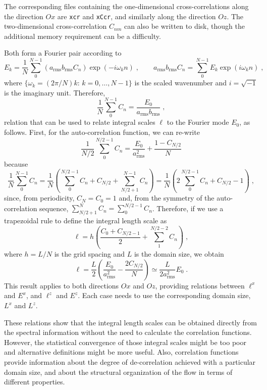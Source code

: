 The corresponding files containing the one-dimensional cross-correlations along
the direction $Ox$ are {\tt xcr} and {\tt xCcr}, and similarly along the
direction $Oz$. The two-dimensional cross-correlation $C_{nm}$ can also be
written to disk, though the additional memory requirement can be a difficulty.

Both form a Fourier pair according to
\begin{equation*}
E_k=\frac{1}{N}\sum_0^{N-1}(a_\mathrm{rms}b_\mathrm{rms}C_n)\exp(-i\omega_kn)\;,\qquad
a_\mathrm{rms}b_\mathrm{rms}C_n=\sum_0^{N-1}E_k\exp(i\omega_kn)\;,
\end{equation*}
where $\{\omega_k=(2\pi/N)k:\, k = 0,\ldots,N-1\}$ is the scaled wavenumber and
$i=\sqrt{-1}$ is the imaginary unit. Therefore,
\begin{equation}
\frac{1}{N}\sum_0^{N-1}C_n=\frac{E_0}{a_\mathrm{rms}b_\mathrm{rms}} \;,
\end{equation}
relation that can be used to relate integral scales $\ell$ to the Fourier mode
$E_0$, as follows. First, for the auto-correlation function, we can re-write
\begin{equation}
\frac{1}{N/2}\sum_0^{N/2-1}C_n=\frac{E_0}{a_\mathrm{rms}^2}+\frac{1-C_{N/2}}{N}
\end{equation}
because
\begin{equation*}
\frac{1}{N}\sum_0^{N-1}C_n = \frac{1}{N}\left(\sum_0^{N/2-1}C_n
+C_{N/2}+\sum_{N/2+1}^{N-1}C_n\right) = \frac{1}{N}\left(2\sum_0^{N/2-1}C_n
+C_{N/2}-1\right) \;,
\end{equation*}
since, from periodicity, $C_N=C_0=1$ and, from the symmetry of the
auto-correlation sequence, $\sum_{N/2+1}^{N}C_n=\sum_0^{N/2-1}C_n$. Therefore,
if we use a trapezoidal rule to define the integral length scale as
\begin{equation}
\ell=h\left(\frac{C_0+C_{N/2-1}}{2}+\sum_1^{N/2-2}C_n\right)\;,
\end{equation}
where $h=L/N$ is the grid spacing and $L$ is the domain size, we obtain
\begin{equation}
\ell=\frac{L}{2}\left(\frac{E_0}{a_\mathrm{rms}^2}-\frac{2C_{N/2}}{N}\right)
\simeq \frac{L}{2a_\mathrm{rms}^2}E_0\;.
\end{equation}
This result applies to both directions $Ox$ and $Oz$, providing relations
between $\ell^x$ and $E^x$, and $\ell^z$ and $E^z$. Each case needs to use the
corresponding domain size, $L^x$ and $L^z$.

These relations show that the integral length scales can be obtained directly
from the spectral information without the need to calculate the correlation
functions. However, the statistical convergence of those integral scales might
be too poor and alternative definitions might be more useful. Also, correlation
functions provide information about the degree of de-correlation achieved with a
particular domain size, and about the structural organization of the flow in
terms of different properties.


